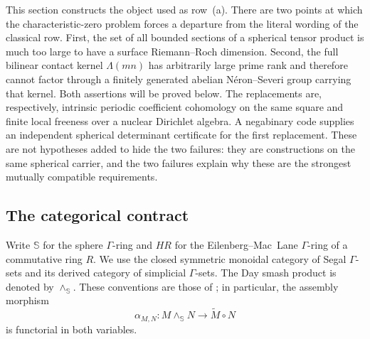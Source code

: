 \documentclass[11pt]{amsart}
\theoremstyle{definition}
\theoremstyle{remark}
\begin{document}
This section constructs the object used as row~(a).  There are two points at
which the characteristic-zero problem forces a departure from the literal
wording of the classical row.  First, the set of all bounded sections of a
spherical tensor product is much too large to have a surface
Riemann--Roch dimension.  Second, the full bilinear contact kernel
$\Lambda(mn)$ has arbitrarily large prime rank and therefore cannot factor
through a finitely generated abelian N\'eron--Severi group carrying that
kernel.  Both assertions will be proved below.  The
replacements are, respectively, intrinsic periodic coefficient cohomology
on the same square and finite local freeness over a nuclear Dirichlet
algebra.  A negabinary code supplies an independent spherical determinant
certificate for the first replacement.  These are
not hypotheses added to hide the two failures: they are constructions on the
same spherical carrier, and the two failures explain why these are the
strongest mutually compatible requirements.

\subsection{The categorical contract}

Write $\mathbb S$ for the sphere $\Gamma$-ring and $HR$ for the
Eilenberg--Mac~Lane $\Gamma$-ring of a commutative ring $R$.  We use the
closed symmetric monoidal category of Segal $\Gamma$-sets and its derived
category of simplicial $\Gamma$-sets.  The Day smash product is denoted by
$\wedge_{\mathbb S}$.  These conventions are those of
\cite[\S\S2,7]{CC-AbsoluteAlgebra}; in particular, the assembly morphism
\begin{equation}\label{eq:assembly}
 \alpha_{M,N}:M\wedge_{\mathbb S}N\longrightarrow \widetilde M\circ N
\end{equation}
is functorial in both variables.
\end{document}
